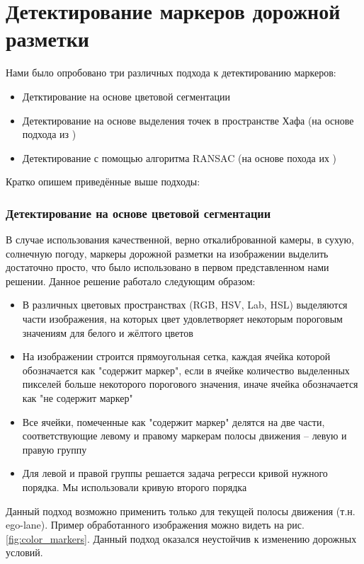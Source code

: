 \documentclass[aps,%
14pt,%
final,%
oneside,
onecolumn,%
musixtex, %
superscriptaddress,%
centertags]{extarticle} %
\begin{document}
\section{Детектирование маркеров дорожной разметки}
Нами было опробовано три различных подхода к детектированию маркеров:
\begin{itemize}
    \item Детктирование на основе цветовой сегментации
    \item Детектирование на основе выделения точек в пространстве Хафа (на основе подхода из \cite{song2017real} )
    \item Детектирование с помощью алгоритма RANSAC (на основе похода их \cite{aly2008real} )
\end{itemize}

Кратко опишем приведённые выше подходы:

\subsubsection*{Детектирование на основе цветовой сегментации}

В случае использования качественной, верно откалиброванной камеры, в сухую, солнечную погоду, маркеры дорожной разметки на изображении выделить достаточно просто, что было использовано в первом представленном нами решении. Данное решение работало следующим образом:
\begin{itemize}
    \item В различных цветовых пространствах (RGB, HSV, Lab, HSL) выделяются части изображения, на которых цвет удовлетворяет некоторым пороговым значениям для белого и жёлтого цветов
    \item На изображении строится прямоугольная сетка, каждая ячейка которой обозначается как "содержит маркер", если в ячейке количество выделенных пикселей больше некоторого порогового значения, иначе ячейка обозначается как "не содержит маркер"
    \item Все ячейки, помеченные как "содержит маркер" делятся на две части, соответствующие левому и правому маркерам полосы движения -- левую и правую группу
    \item Для левой и правой группы решается задача регресси кривой нужного порядка. Мы использовали кривую второго порядка
\end{itemize}

Данный подход возможно применить только для текущей полосы движения (т.н. ego-lane). Пример обработанного изображения можно видеть на рис. \ref{fig:color_markers}. Данный подход оказался неустойчив к изменению дорожных условий.
\end{document}
